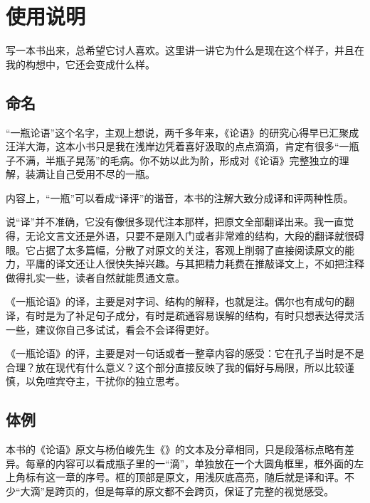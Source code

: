 \chapter*{使\quad 用\quad 说\quad 明}

写一本书出来，总希望它讨人喜欢。这里讲一讲它为什么是现在这个样子，并且在我的构想中，它还会变成什么样。


\lypdfbookmark\section*{命名}

“一瓶论语”这个名字，主观上想说，两千多年来，《论语》的研究心得早已汇聚成汪洋大海，这本小书只是我在浅岸边凭着喜好汲取的点点滴滴，肯定有很多“一瓶子不满，半瓶子晃荡”的毛病。你不妨以此为阶，形成对《论语》完整独立的理解，装满让自己受用不尽的一瓶。

内容上，“一瓶”可以看成“译评”的谐音，本书的注解大致分成译和评两种性质。

说“译”并不准确，它没有像很多现代注本那样，把原文全部翻译出来。我一直觉得，无论文言文还是外语，只要不是刚入门或者非常难的结构，大段的翻译就很碍眼。它占据了太多篇幅，分散了对原文的关注，客观上削弱了直接阅读原文的能力，平庸的译文还让人很快失掉兴趣。与其把精力耗费在推敲译文上，不如把注释做得扎实一些，读者自然就能贯通文意。

《一瓶论语》的译，主要是对字词、结构的解释，也就是注。偶尔也有成句的翻译，有时是为了补足句子成分，有时是疏通容易误解的结构，有时只想表达得灵活一些，建议你自己多试试，看会不会译得更好。

《一瓶论语》的评，主要是对一句话或者一整章内容的感受：它在孔子当时是不是合理？放在现代有什么意义？这个部分直接反映了我的偏好与局限，所以比较谨慎，以免喧宾夺主，干扰你的独立思考。


\lypdfbookmark\section*{体例}

本书的《论语》原文与杨伯峻先生《》的文本及分章相同，只是段落标点略有差异。每章的内容可以看成瓶子里的一“滴”，单独放在一个大圆角框里，框外面的左上角标有这一章的序号。框的顶部是原文，用\colorbox{lytextbackground}{浅灰底}高亮，随后就是译和评。不少“大滴”是跨页的，但是每章的原文都不会跨页，保证了完整的视觉感受。


